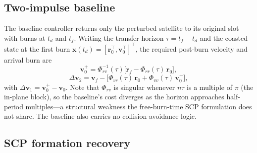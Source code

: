 \documentclass[10pt,twocolumn,letterpaper]{article}
\begin{document}
\subsection{Two-impulse baseline}
\label{sec:baseline}

The baseline controller returns only the perturbed satellite to its original
slot with burns at $t_d$ and $t_f$. Writing the transfer horizon
$\tau = t_f - t_d$ and the coasted state at the first burn
$\mathbf{x}(t_d) = [\mathbf{r}_0^\top, \mathbf{v}_0^\top]^\top$, the required
post-burn velocity and arrival burn are
\begin{equation}
\label{eq:twoimpulse}
\mathbf{v}_0^{+} = \Phi_{rv}^{-1}(\tau)\bigl[\mathbf{r}_f - \Phi_{rr}(\tau)\,\mathbf{r}_0\bigr],
\end{equation}
\begin{equation}
\Delta\mathbf{v}_2 = \mathbf{v}_f - \bigl[\Phi_{vr}(\tau)\,\mathbf{r}_0 + \Phi_{vv}(\tau)\,\mathbf{v}_0^{+}\bigr],
\end{equation}
with $\Delta\mathbf{v}_1 = \mathbf{v}_0^{+} - \mathbf{v}_0$. Note that
$\Phi_{rv}$ is singular whenever $n\tau$ is a multiple of $\pi$ (the in-plane
block), so the baseline's cost diverges as the horizon approaches half-period
multiples---a structural weakness the free-burn-time SCP formulation does not
share. The baseline also carries no collision-avoidance logic.

\subsection{SCP formation recovery}
\label{sec:scp}
\end{document}
